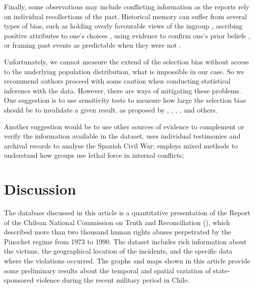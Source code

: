 \documentclass[a4paper,12pt]{article}
\begin{document}
Finally, some observations may include conflicting information as the reports rely on individual recollections of the past. Historical memory can suffer from several types of bias, such as holding overly favourable views of the ingroup \citep{sahdra2007group}, ascribing positive attributes to one's choices \citep{mather2000choice}, using evidence to confirm one's prior beliefs \citep{nickerson1998confirmation}, or framing past events as predictable when they were not \citep{fischhoff2007early}.

Unfortunately, we cannot measure the extend of the selection bias without access to the underlying population distribution, what is impossible in our case. So we recommend authors proceed with some caution when conducting statistical inference with the data. However, there are ways of mitigating these problems. One suggestion is to use sensitivity tests to measure how large the selection bias should be to invalidate a given result, as proposed by \citet{blackwell2014selection}, \citet{cinelli2018making}, \citet{oster2017unobservable}, \citet{rosenbaum1983assessing}, and others. %

Another suggestion would be to use other sources of evidence to complement or verify the information available in the dataset. \citet{balcells2017rivalry} uses individual testimonies and archival records to analyse the Spanish Civil War; \citet{kalyvas2006logic} employs mixed methods to understand how groups use lethal force in internal conflicts;

\section{Discussion}
\label{sec:discussion}

The database discussed in this article is a quantitative presentation of the Report of the Chilean National Commission on Truth and Reconciliation (\citeyear{report1991}), which described more than two thousand human rights abuses perpetrated by the Pinochet regime from 1973 to 1990. The dataset includes rich information about the victims, the geographical location of the incidents, and the specific data where the violations occurred. The graphs and maps shown in this article provide some preliminary results about the temporal and spatial variation of state-sponsored violence during the recent military period in Chile.
\end{document}
